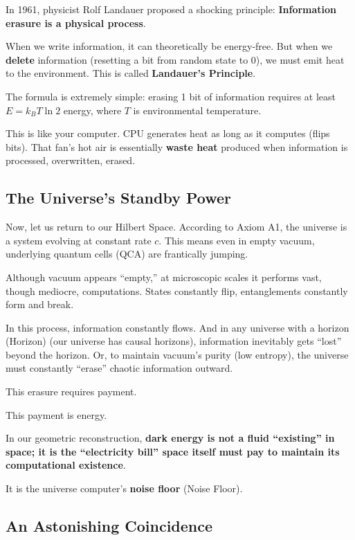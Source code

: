 \documentclass[11pt,a4paper,twoside]{book}
\begin{document}
In 1961, physicist Rolf Landauer proposed a shocking principle: \textbf{Information erasure is a physical process}.

When we write information, it can theoretically be energy-free. But when we \textbf{delete} information (resetting a bit from random state to 0), we must emit heat to the environment. This is called \textbf{Landauer's Principle}.

The formula is extremely simple: erasing 1 bit of information requires at least $E = k_B T \ln 2$ energy, where $T$ is environmental temperature.

This is like your computer. CPU generates heat as long as it computes (flips bits). That fan's hot air is essentially \textbf{waste heat} produced when information is processed, overwritten, erased.

\subsection{The Universe's Standby Power}

Now, let us return to our Hilbert Space. According to Axiom A1, the universe is a system evolving at constant rate $c$. This means even in empty vacuum, underlying quantum cells (QCA) are frantically jumping.

Although vacuum appears ``empty,'' at microscopic scales it performs vast, though mediocre, computations. States constantly flip, entanglements constantly form and break.

In this process, information constantly flows. And in any universe with a horizon (Horizon) (our universe has causal horizons), information inevitably gets ``lost'' beyond the horizon. Or, to maintain vacuum's purity (low entropy), the universe must constantly ``erase'' chaotic information outward.

This erasure requires payment.

This payment is energy.

In our geometric reconstruction, \textbf{dark energy is not a fluid ``existing'' in space; it is the ``electricity bill'' space itself must pay to maintain its computational existence}.

It is the universe computer's \textbf{noise floor} (Noise Floor).

\subsection{An Astonishing Coincidence}
\end{document}
